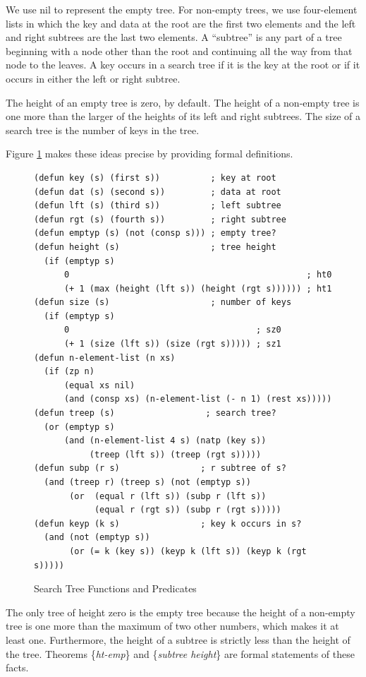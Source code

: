\label{empty-tree}
We use nil to represent the empty tree.
For non-empty trees, we use
four-element lists in which the key and data at
the root are the first two elements and the left
and right subtrees are the last two elements.
\label{subtree}
A ``subtree'' is any part of a tree beginning with a node
other than the root
and continuing all the way from that node to the leaves.
A key occurs in a search tree if it is the key at the root
or if it occurs in either the left or right subtree.

\label{height}
The height of an empty tree is zero, by default.
The height of a non-empty tree is one more than the
larger of the heights of its left and right subtrees.
The size of a search tree is the number of keys in the tree.

Figure \ref{fig:tree-functions} makes these ideas precise
by providing formal definitions.

\begin{figure}
\begin{center}
\begin{Verbatim}
(defun key (s) (first s))          ; key at root
(defun dat (s) (second s))         ; data at root
(defun lft (s) (third s))          ; left subtree
(defun rgt (s) (fourth s))         ; right subtree
(defun emptyp (s) (not (consp s))) ; empty tree?
(defun height (s)                  ; tree height
  (if (emptyp s)
      0                                               ; ht0
      (+ 1 (max (height (lft s)) (height (rgt s)))))) ; ht1
(defun size (s)                    ; number of keys
  (if (emptyp s)
      0                                     ; sz0
      (+ 1 (size (lft s)) (size (rgt s))))) ; sz1
(defun n-element-list (n xs)
  (if (zp n)
      (equal xs nil)
      (and (consp xs) (n-element-list (- n 1) (rest xs)))))
(defun treep (s)                  ; search tree?
  (or (emptyp s)
      (and (n-element-list 4 s) (natp (key s))
           (treep (lft s)) (treep (rgt s)))))
(defun subp (r s)                ; r subtree of s?
  (and (treep r) (treep s) (not (emptyp s))
       (or  (equal r (lft s)) (subp r (lft s))
            (equal r (rgt s)) (subp r (rgt s)))))
(defun keyp (k s)                ; key k occurs in s?
  (and (not (emptyp s))
       (or (= k (key s)) (keyp k (lft s)) (keyp k (rgt s)))))
\end{Verbatim}
\end{center}
\caption{Search Tree Functions and Predicates}
\label{fig:tree-functions}
\end{figure}

The only tree of height zero is the empty tree because
the height of a non-empty tree is one more than the maximum
of two other numbers, which makes it at least one.
Furthermore, the height of a subtree is strictly less than the height of the tree.
Theorems \{\emph{ht-emp}\} and \{\emph{subtree height}\}
are formal statements of these facts.

